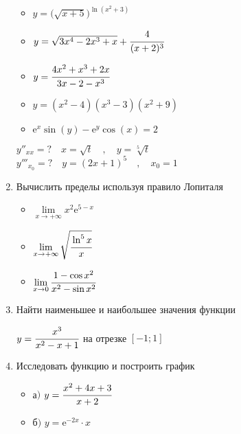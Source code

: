 \documentclass{article}
\begin{document}
\begin{multicols}{2}
\begin{enumerate}[label=\arabic*.]
\begin{multicols}{2}
\begin{itemize}[label=""]
				\item $y=\Big(\sqrt{x+5}\Big)^{\ln (x^2+3)}$
			\end{itemize}
			\vfill\null\columnbreak
			\begin{itemize}[label=""]
				\item $y=\sqrt{3x^4-2x^3+x} + \cfrac{4}{(x+2)^3}$
				\item $y=\cfrac{4x^2+x^3+2x}{3x-2-x^3}$
				\item $y=(x^2 -4)(x^3 -3)(x^2 +9)$
				\item $\mbox{e}^x\sin(y) - \mbox{e}^y\cos(x) = 2$
			\end{itemize}
		\end{multicols}
		\vspace{-3mm}
		$y''_{xx}=? \quad x=\sqrt{t} \quad,\quad y=\sqrt[5]{t}$ \\
		$y'''_{x_0}=? \quad y=(2x+1)^5 \quad,\quad x_0=1$
		\item Вычислить пределы используя правило Лопиталя
		\begin{multicols}{3}
			\raggedcolumns
			\begin{itemize}[label=""]
				\item $\lim\limits_{x\to+\infty} x^2\mbox{e}^{5-x}$
				\vfill\null\columnbreak
				\item $\lim\limits_{x\to+\infty}\sqrt{\cfrac{\ln^5x}{x}}$
				\vfill\null\columnbreak
				\item $\lim\limits_{x\to 0}\cfrac{1-\cos x^2}{x^2-\sin x^2}$
				\vfill\null\columnbreak
			\end{itemize}
		\end{multicols}
		\vspace{-4mm}	
		\item Найти наименьшее и наибольшее значения функции
		
		$y=\cfrac{x^3}{x^2-x+1}$ на отрезке $[-1;1]$
		\item Исследовать функцию и построить график
		\begin{multicols}{2}
			\begin{itemize}[label=""]
				\setlength\itemsep{0.5em}
				\item а$)$ $y=\cfrac{x^2+4x+3}{x+2}$
			\end{itemize}
			\vfill\null\columnbreak
			\begin{itemize}[label=""]
				\setlength\itemsep{0.5em}
				\item б$)$ $y=\mbox{e}^{-2x}\cdot x$
			\end{itemize}
		\end{multicols}
	\end{enumerate}	
\end{multicols}
\end{document}
